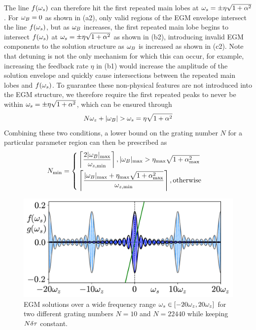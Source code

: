 The line $f(\omega_s)$ can therefore hit the first repeated main lobes at $\omega_s = \pm \eta \sqrt{1+\alpha^2}$. 
For $\omega_B=0$ as shown in (a2), only valid regions of the EGM envelope intersect the line $f(\omega_s)$, but as $\omega_B$ increases, 
the first repeated main lobe begins to intersect $f(\omega_s)$ at $\omega_s = \pm \eta \sqrt{1+\alpha^2}$ as shown in (b2), introducing invalid EGM components to the solution structure as $\omega_B$ is increased as shown in (c2). 
Note that detuning is not the only mechanism for which this can occur, for example, 
increasing the feedback rate $\eta$ in (b1) would increase the amplitude of the solution envelope and quickly cause intersections between the repeated main lobes and $f(\omega_s)$. 
To guarantee these non-physical features are not introduced into the EGM structure, we therefore require the first repeated peaks to never be within $\omega_s = \pm \eta \sqrt{1+\alpha^2}$, which can be ensured through
%
\begin{equation*}
    N \omega_z + |\omega_B| > \omega_s = \eta \sqrt{1+\alpha^2}
\end{equation*}
%
Combining these two conditions, a lower bound on the grating number $N$ for a particular parameter region can then be prescribed as
%
\begin{equation}
    \label{eq:Nmin}
    N_\text{min} = 
    \begin{cases}
        \left\lceil \dfrac{2|\omega_B|_{\max}}{\omega_{z,\min}} \right\rceil, |\omega_B|_{\max} > \eta_{\max} \sqrt{1+\alpha_{\max}^2} \\[2ex]
        \left\lceil \dfrac{|\omega_B|_{\max} + \eta_{\max} \sqrt{1+\alpha_{\max}^2}}{\omega_{z,\min}} \right\rceil, \text{otherwise}
    \end{cases}
\end{equation}
%
\begin{figure}[!t]
    \centering
    
    \includegraphics[width=\linewidth]{Images/discretised_EGM_wideview.pdf}
    
    \caption{EGM solutions over a wide frequency range $\omega_s \in [-20\omega_z, 20\omega_z]$ for two different grating numbers $N = 10$ and $N = 22440$ while keeping $N\delta \tau$ constant.}
    
    \label{fig:discretised_EGM_wide_view}
\end{figure}
